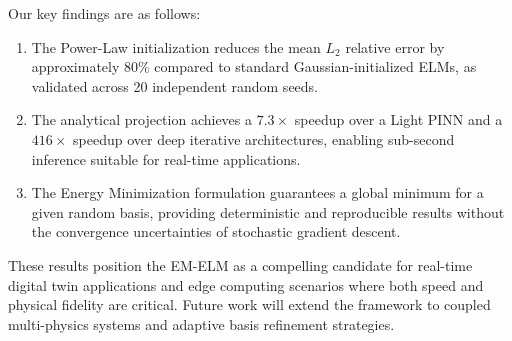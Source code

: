 \documentclass[final,12pt,3p,times,fleqn]{elsarticle}
\begin{document}
Our key findings are as follows:
\begin{enumerate}
    \item The Power-Law initialization reduces the mean $L_2$ relative error by approximately $80\%$ compared to standard Gaussian-initialized ELMs, as validated across 20 independent random seeds.
    \item The analytical projection achieves a $7.3\times$ speedup over a Light PINN and a $416\times$ speedup over deep iterative architectures, enabling sub-second inference suitable for real-time applications.
    \item The Energy Minimization formulation guarantees a global minimum for a given random basis, providing deterministic and reproducible results without the convergence uncertainties of stochastic gradient descent.
\end{enumerate}

These results position the EM-ELM as a compelling candidate for real-time digital twin applications and edge computing scenarios where both speed and physical fidelity are critical.
Future work will extend the framework to coupled multi-physics systems and adaptive basis refinement strategies.


\nocite{*} 
 
\end{document}
